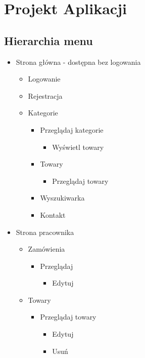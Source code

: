 \documentclass[10pt,a4paper]{article}
\begin{document}
	  \section{Projekt Aplikacji}
	  \subsection{ Hierarchia menu}
	    \small
	    \begin{itemize}
          \item Strona główna - dostępna bez logowania
          \begin{itemize}
            \item Logowanie
			\item Rejestracja
			\item Kategorie
			\begin{itemize}
 			  \item Przeglądaj kategorie
 			  \begin{itemize}
		        \item Wyświetl towary
		      \end{itemize}
		      \item Towary
		      \begin{itemize}
		        \item Przeglądaj towary
		      \end{itemize}
		      \item Wyszukiwarka
			  \item Kontakt
		      \end{itemize}
		      \end{itemize}
		       \item Strona pracownika
		       \begin{itemize}
		       \item Zamówienia
		       \begin{itemize}
		         \item Przeglądaj
		         \begin{itemize}
		          \item Edytuj
		         \end{itemize}
		       \end{itemize}
		       \item Towary
		       \begin{itemize}
		         \item Przeglądaj towary
		         \begin{itemize}
		           \item Edytuj
				   \item Usuń

\end{itemize}
\end{itemize}
\end{itemize}
\end{itemize}
\end{document}
